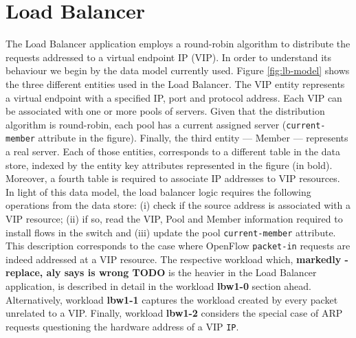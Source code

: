 
\label{cenas}


\section{Load Balancer}
\label{sec:feasibility:lb}
\glsresetall

The Load Balancer application employs a round-robin algorithm to distribute the
requests addressed to a virtual endpoint \gls{IP} (VIP). In order to
understand its behaviour we begin by the data model currently used. Figure
\ref{fig:lb-model} shows the three different entities used in the Load
Balancer. The  VIP entity 
represents a virtual endpoint with a specified \gls{IP}, port and
protocol address. Each VIP can be associated with one or more pools of
servers. Given that the distribution algorithm is round-robin, each pool
has a current assigned server (\texttt{current-member} attribute in the figure). Finally, the third entity --- Member
--- represents a real server. Each of those entities, corresponds
to a different table in the data store, indexed by the entity
key attributes represented in the figure (in bold). Moreover, a fourth table is
required to associate \gls{IP} addresses to VIP resources. In light of
this data model, the load balancer logic requires the following
operations from the data store: (i) check if the source address is
associated with a VIP resource; (ii) if so, read the VIP, Pool and
Member information required to install flows in the switch and (iii)
update the pool \texttt{current-member} attribute. This description corresponds to the case where OpenFlow
\texttt{packet-in} requests are indeed addressed at a VIP
resource. The respective workload which, \textbf{markedly - replace,
  aly says is wrong TODO} is the heavier in
the Load Balancer application, is described in detail in the workload
\textbf{lbw1-0} section ahead. Alternatively, workload
\textbf{lbw1-1} captures the workload created by every
packet unrelated to a VIP. Finally, workload \textbf{lbw1-2}
considers the special case of ARP requests questioning the hardware
address of a VIP \texttt{IP}.

